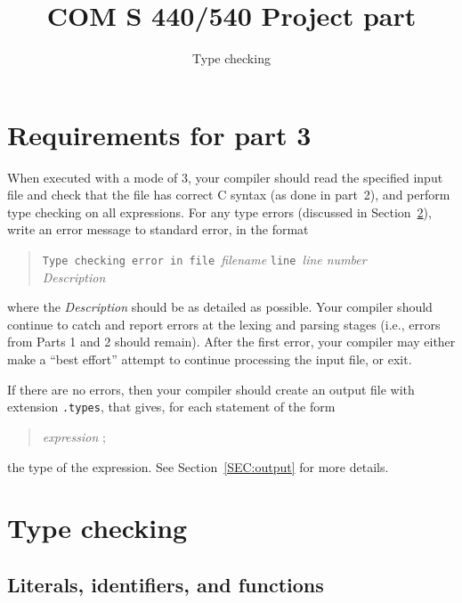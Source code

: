 \documentclass{article}
\title{COM S 440/540 Project part \typecheck}
\author{Type checking}
\date{}
\newcommand{\parser}{2}
\newcommand{\typecheck}{3}
\begin{document}
\maketitle


\section{Requirements for part \typecheck}

When executed with a mode of \typecheck,
your compiler should read the specified input file
and check that the file has correct C syntax
(as done in part~\parser),
and perform type checking on all expressions.
For any type errors (discussed in Section~\ref{SEC:types}),
write an error message to standard error, in the format
\begin{quote}
  \begin{tabbing}
		{\tt Type ch}\={\tt ecking error in file }\emph{filename}
		{\tt line }\emph{line number}
	\\
		\> \emph{Description}
  \end{tabbing}
\end{quote}
where the \emph{Description} should be as detailed as possible.
Your compiler should continue to catch and report errors
at the lexing and parsing stages
(i.e., errors from Parts 1 and \parser{} should remain).
After the first error,
your compiler may either make a ``best effort''
attempt to continue processing the input file, or exit.

If there are no errors,
then your compiler should create an output file
with extension {\tt .types},
that gives, for each statement of the form
\begin{quote}
\emph{expression} ;
\end{quote}
the type of the expression.
See Section~\ref{SEC:output}
for more details.

\section{Type checking} \label{SEC:types}


\subsection{Literals, identifiers, and functions}
\end{document}
